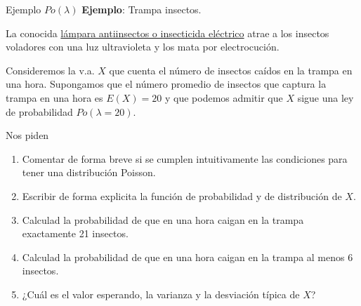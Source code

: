 \documentclass[
  ignorenonframetext,
  aspectratio=169]{beamer}
\providecommand{\tightlist}{%
  \setlength{\itemsep}{0pt}\setlength{\parskip}{0pt}}\usepackage{longtable,booktabs,array}
\begin{document}
\begin{frame}{Ejemplo \(Po(\lambda)\)}
\protect\hypertarget{ejemplo-polambda}{}
\textbf{Ejemplo}: Trampa insectos.

La conocida
\href{https://es.wikipedia.org/wiki/Insecticida_el\%C3\%A9ctrico}{lámpara
antiinsectos o insecticida eléctrico} atrae a los insectos voladores con
una luz ultravioleta y los mata por electrocución.

Consideremos la v.a. \(X\) que cuenta el número de insectos caídos en la
trampa en una hora. Supongamos que el número promedio de insectos que
captura la trampa en una hora es \(E(X)=20\) y que podemos admitir que
\(X\) sigue una ley de probabilidad \(Po(\lambda=20)\).

Nos piden

\begin{enumerate}
\tightlist
\item
  Comentar de forma breve si se cumplen intuitivamente las condiciones
  para tener una distribución Poisson.
\item
  Escribir de forma explicita la función de probabilidad y de
  distribución de \(X\).
\item
  Calculad la probabilidad de que en una hora caigan en la trampa
  exactamente 21 insectos.
\item
  Calculad la probabilidad de que en una hora caigan en la trampa al
  menos 6 insectos.
\item
  ¿Cuál es el valor esperando, la varianza y la desviación típica de
  \(X\)?
\end{enumerate}
\end{frame}
\end{document}
